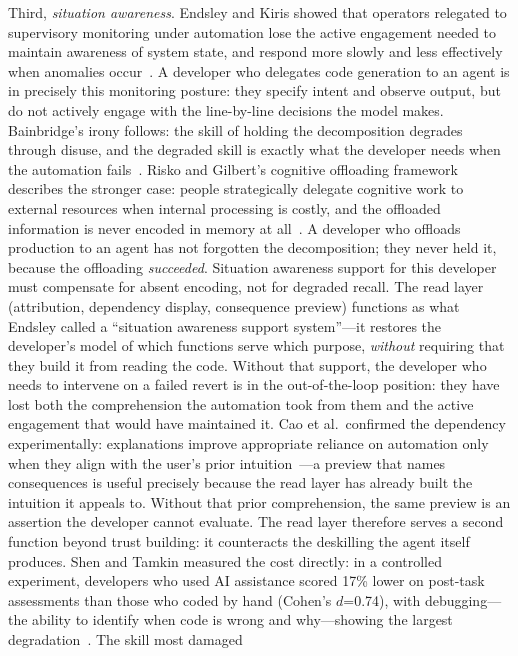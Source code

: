 Third, \emph{situation awareness}. Endsley and Kiris showed that operators
relegated to supervisory monitoring under automation lose the active engagement
needed to maintain awareness of system state, and respond more slowly and less
effectively when anomalies occur~\cite{endsley1995}. A developer who delegates
code generation to an agent is in precisely this monitoring posture: they specify
intent and observe output, but do not actively engage with the line-by-line
decisions the model makes. Bainbridge's irony follows: the skill of holding the
decomposition degrades through disuse, and the degraded skill is exactly what the
developer needs when the automation fails~\cite{bainbridge1983}. Risko and
Gilbert's cognitive offloading framework describes the stronger case: people
strategically delegate cognitive work to external resources when internal
processing is costly, and the offloaded information is never encoded in memory
at all~\cite{risko2016}. A developer who offloads production to an agent has
not forgotten the decomposition; they never held it, because the offloading
\emph{succeeded}. Situation awareness support for this developer must compensate
for absent encoding, not for degraded recall. The read layer
(attribution, dependency display, consequence preview) functions as what Endsley
called a ``situation awareness support system''---it restores the developer's
model of which functions serve which purpose, \emph{without} requiring that they
build it from reading the code. Without that support, the developer who needs to
intervene on a failed revert is in the out-of-the-loop position: they have lost
both the comprehension the automation took from them and the active engagement
that would have maintained it. Cao et al.\ confirmed the dependency
experimentally: explanations improve appropriate reliance on automation only when
they align with the user's prior intuition~\cite{cao2024}---a preview that names
consequences is useful precisely because the read layer has already built the
intuition it appeals to. Without that prior comprehension, the same preview is an
assertion the developer cannot evaluate.
The read layer therefore serves a second function beyond trust building: it
counteracts the deskilling the agent itself produces. Shen and Tamkin measured
the cost directly: in a controlled experiment, developers who used AI assistance
scored 17\% lower on post-task assessments than those who coded by hand (Cohen's
$d$=0.74), with debugging---the ability to identify when code is wrong and
why---showing the largest degradation~\cite{shen2026skills}. The skill most damaged
